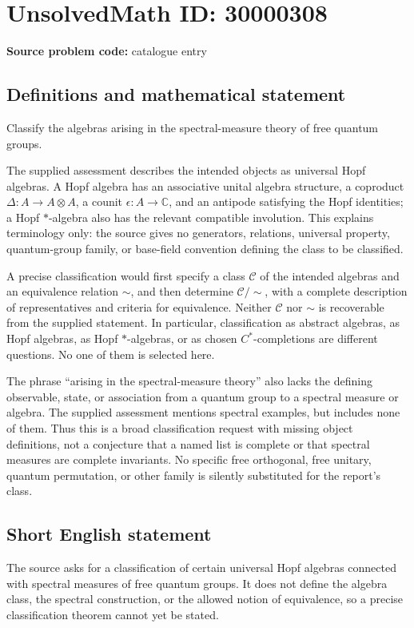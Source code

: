 \documentclass[11pt]{article}
\newcommand{\C}{\mathbb{C}}
\begin{document}
\section*{UnsolvedMath ID: 30000308}
\textbf{Source problem code:} catalogue entry
\subsection{Definitions and mathematical statement}
Classify the algebras arising in the spectral-measure theory of free quantum groups.

The supplied assessment describes the intended objects as universal Hopf algebras. A Hopf algebra has an associative unital algebra structure, a coproduct $\Delta:A\to A\otimes A$, a counit $\epsilon:A\to\C$, and an antipode satisfying the Hopf identities; a Hopf $*$-algebra also has the relevant compatible involution. This explains terminology only: the source gives no generators, relations, universal property, quantum-group family, or base-field convention defining the class to be classified.

A precise classification would first specify a class $\mathcal C$ of the intended algebras and an equivalence relation $\sim$, and then determine $\mathcal C/\!\sim$, with a complete description of representatives and criteria for equivalence. Neither $\mathcal C$ nor $\sim$ is recoverable from the supplied statement. In particular, classification as abstract algebras, as Hopf algebras, as Hopf $*$-algebras, or as chosen $C^*$-completions are different questions. No one of them is selected here.

The phrase ``arising in the spectral-measure theory'' also lacks the defining observable, state, or association from a quantum group to a spectral measure or algebra. The supplied assessment mentions spectral examples, but includes none of them. Thus this is a broad classification request with missing object definitions, not a conjecture that a named list is complete or that spectral measures are complete invariants. No specific free orthogonal, free unitary, quantum permutation, or other family is silently substituted for the report's class.
\subsection{Short English statement}
The source asks for a classification of certain universal Hopf algebras connected with spectral measures of free quantum groups. It does not define the algebra class, the spectral construction, or the allowed notion of equivalence, so a precise classification theorem cannot yet be stated.
\end{document}
